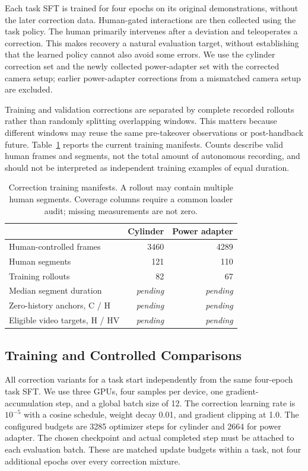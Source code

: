\documentclass[letterpaper,10pt,conference]{ieeeconf}
\newcommand{\pending}{\textit{pending}}
\begin{document}
Each task SFT is trained for four epochs on its original demonstrations, without the later correction data. Human-gated interactions are then collected using the task policy. The human primarily intervenes after a deviation and teleoperates a correction. This makes recovery a natural evaluation target, without establishing that the learned policy cannot also avoid some errors. We use the cylinder correction set and the newly collected power-adapter set with the corrected camera setup; earlier power-adapter corrections from a mismatched camera setup are excluded.

Training and validation corrections are separated by complete recorded rollouts rather than randomly splitting overlapping windows. This matters because different windows may reuse the same pre-takeover observations or post-handback future. Table~\ref{tab:data} reports the current training manifests. Counts describe valid human frames and segments, not the total amount of autonomous recording, and should not be interpreted as independent training examples of equal duration.

\begin{table}[t]
\centering\small
\caption{Correction training manifests. A rollout may contain multiple human segments. Coverage columns require a common loader audit; missing measurements are not zero.}
\label{tab:data}
\begin{tabularx}{\columnwidth}{@{}Xrr@{}}
\toprule
 & Cylinder & Power adapter \\
\midrule
Human-controlled frames & 3460 & 4289 \\
Human segments & 121 & 110 \\
Training rollouts & 82 & 67 \\
Median segment duration & \pending & \pending \\
Zero-history anchors, C / H & \pending & \pending \\
Eligible video targets, H / HV & \pending & \pending \\
\bottomrule
\end{tabularx}
\end{table}

\subsection{Training and Controlled Comparisons}
All correction variants for a task start independently from the same four-epoch task SFT. We use three GPUs, four samples per device, one gradient-accumulation step, and a global batch size of 12. The correction learning rate is $10^{-5}$ with a cosine schedule, weight decay 0.01, and gradient clipping at 1.0. The configured budgets are 3285 optimizer steps for cylinder and 2664 for power adapter. The chosen checkpoint and actual completed step must be attached to each evaluation batch. These are matched update budgets within a task, not four additional epochs over every correction mixture.
\end{document}
